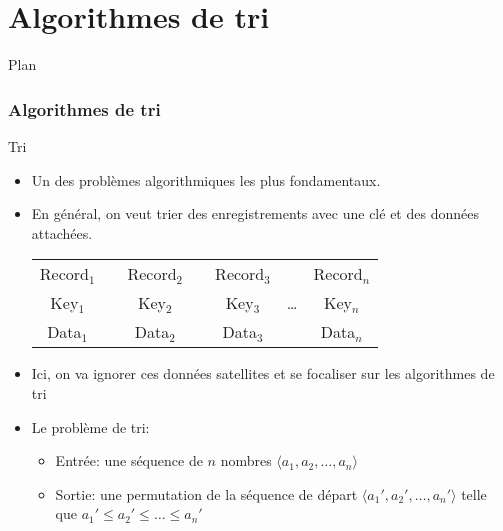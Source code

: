 
\part{Algorithmes de tri}





\begin{frame}{Plan}

\tableofcontents

\end{frame}

\section{Algorithmes de tri}

\begin{frame}{Tri}

\begin{itemize}
\item Un des problèmes algorithmiques les plus fondamentaux.
\item En général, on veut trier des enregistrements avec une clé et des
  données attachées.
\medskip
\begin{center}
\begin{tabular}{ccccccc}
Record$_1$ & & Record$_2$ & & Record$_3$ & & Record$_n$\\
\cline{1-1} \cline{3-3} \cline{5-5} \cline{7-7}
\multicolumn{1}{|c|}{Key$_1$} & & \multicolumn{1}{|c|}{Key$_2$} & & \multicolumn{1}{|c|}{Key$_3$} & \ldots & \multicolumn{1}{|c|}{Key$_n$}\\
 \cline{1-1} \cline{3-3} \cline{5-5} \cline{7-7}
\multicolumn{1}{|c|}{Data$_1$} & & \multicolumn{1}{|c|}{Data$_2$} & & \multicolumn{1}{|c|}{Data$_3$} & & \multicolumn{1}{|c|}{Data$_n$}\\
 \cline{1-1} \cline{3-3} \cline{5-5} \cline{7-7}
\end{tabular}
\end{center}
\medskip
\item Ici, on va ignorer ces données satellites et se focaliser sur
  les algorithmes de tri

\bigskip

\item Le problème de tri:
\begin{itemize}
\item Entrée: une séquence de $n$ nombres $\langle a_1,a_2,\ldots,a_n\rangle$
\item Sortie: une permutation de la séquence de départ $\langle a_1',a_2',\ldots,a_n'\rangle$ telle que $a_1'\leq a_2'\leq\ldots\leq a_n'$
\end{itemize}
\end{itemize}

\end{frame}

